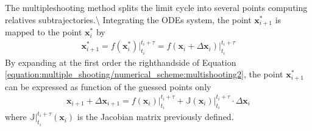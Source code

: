 \documentclass[letterpaper,10pt,english,openany,oneside]{sphinxmanual}
\begin{document}
The multiple\sphinxhyphen{}shooting method splits the limit cycle into several points computing relatives sub\sphinxhyphen{}trajectories.\textbackslash{}
Integrating the ODEs system, the point \(\mathbf{x}^*_{i+1}\) is mapped to the point  \(\mathbf{x}^*_{i}\) by
\begin{equation}\label{equation:multiple_shooting/numerical_scheme:multishooting2}
\begin{split}\mathbf{x}^*_{i+1} = f(\mathbf{x}^*_i)  \big \rvert_{t_{i}}^{t_{i}+\tau} = f(\mathbf{x}_i + \Delta\mathbf{x}_i) \big \rvert_{t_{i}}^{t_{i}+\tau}\end{split}
\end{equation}
By expanding at the first order the right\sphinxhyphen{}hand\sphinxhyphen{}side of Equation \eqref{equation:multiple_shooting/numerical_scheme:multishooting2}, the point \(\mathbf{x}^*_{i+1}\) can be expressed as function of the guessed points only
\begin{equation}\label{equation:multiple_shooting/numerical_scheme:multishooting3}
\begin{split}\mathbf{x}_{i+1} + \Delta\mathbf{x}_{i+1}  =f(\mathbf{x}_i) \big \rvert_{t_{i}}^{t_{i}+\tau} + \mathbb{J} (\mathbf{x}_i) \Big \rvert_{t_{i}}^{t_{i}+\tau}\cdot\Delta\mathbf{x}_i\end{split}
\end{equation}
where \(\mathbb{J} \big \rvert_{t_{i}}^{t_{i}+\tau}(\mathbf{x}_i)\) is the Jacobian matrix previously defined.
\end{document}
